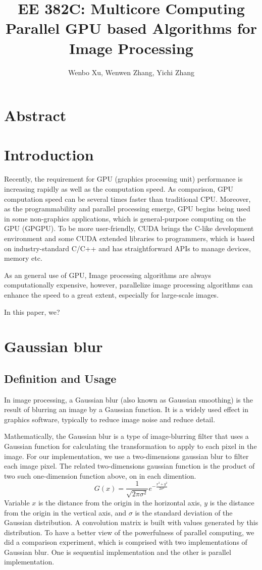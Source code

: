 \documentclass[journal,11pt,onecolumn,draftclsnofoot]{ieeeconf}  %
\author{Wenbo Xu, Wenwen Zhang, Yichi Zhang}
\title{
	EE 382C: Multicore Computing \protect\\
	\Large \bf Parallel GPU based Algorithms for Image Processing
}
\begin{document}
\maketitle
\thispagestyle{empty}
\pagestyle{empty}


\section{Abstract}
  

\section{Introduction}
Recently, the requirement for GPU (graphics processing unit) performance is increasing rapidly as well as the computation speed. As comparison, GPU computation speed can be several times faster than traditional CPU. Moreover, as the programmability and parallel processing emerge\cite{1}, GPU begins being used in some non-graphics applications, which is general-purpose computing on the GPU (GPGPU). To be more user-friendly, CUDA brings the C-like development 
environment and some CUDA extended libraries to programmers, which is based on industry-standard C/C++ and has straightforward APIs to manage devices, memory etc.

As an general use of GPU, Image processing algorithms are always computationally expensive, however, parallelize image processing algorithms can enhance the speed to a great extent, especially for large-scale images.

In this paper, we?

\section{Gaussian blur}
\subsection{Definition and Usage}
In image processing, a Gaussian blur (also known as Gaussian smoothing) is the result of blurring an image by a Gaussian function. It is a widely used effect in graphics software, typically to reduce image noise and reduce detail. 

Mathematically, the Gaussian blur is a type of image-blurring filter that uses a Gaussian function for calculating the transformation to apply to each pixel in the image.  For our implementation, we use a two-dimensions gaussian blur to filter each image pixel. The related two-dimensions gaussian function is the product of two such one-dimension function above, on in each dimention. 
  \[G(x) = \frac{1}{ \sqrt{2 \pi   \sigma ^{2} } } e^{ -\frac{ x^{2} +  y^{2}}{2  \sigma ^{2} }}\]
 Variable $x$ is the distance from the origin in the horizontal axis, $y$ is the distance from the origin in the vertical axis, and $\sigma$ is the standard deviation of the Gaussian distribution. A convolution matrix is built with values generated by this distribution.  
 To have a better view of the powerfulness of parallel computing, we did a comparison experiment, which is comprised with two implementations of Gaussian blur. One is sequential implementation and the other is parallel implementation. 
\end{document}
